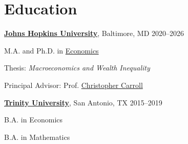 
\section{Education}
\href{https://www.jhu.edu}{\textbf{Johns Hopkins University}}, Baltimore, MD \hfill 2020--2026
\begin{outerlist}
	\item M.A. and Ph.D.  in \href{https://econ.jhu.edu} {Economics}
	 \item Thesis: \textit{Macroeconomics and Wealth Inequality}
	  {\item Principal Advisor: Prof. \href{https://econ.jhu.edu/directory/christopher-carroll/}{Christopher Carroll} 
	}
\end{outerlist}


\vspace{0.1in}
\href{https://www.trinity.edu}{\textbf{Trinity University}}, San Antonio, TX \hfill 2015--2019
\begin{outerlist}
        \item B.A. in Economics
        \item B.A. in Mathematics 
\end{outerlist}
